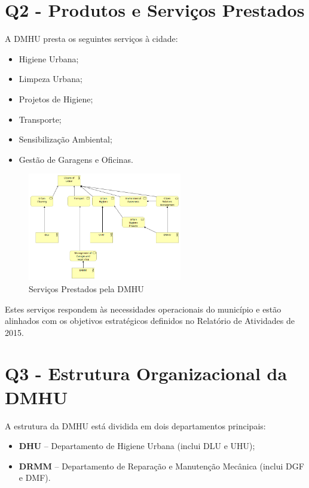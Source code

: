 \documentclass[12pt,a4paper,final]{article}
\begin{document}
    \section*{Q2 - Produtos e Serviços Prestados}\label{sec:produtos-e-servicos-prestados}
    A DMHU presta os seguintes serviços à cidade:
    \begin{itemize}
        \item Higiene Urbana;
        \item Limpeza Urbana;
        \item Projetos de Higiene;
        \item Transporte;
        \item Sensibilização Ambiental;
        \item Gestão de Garagens e Oficinas.
    \end{itemize}

    \begin{figure}[H]
        \centering
        \includegraphics[width=0.6\textwidth]{Q2 - Business Services}
        \caption{Serviços Prestados pela DMHU}
        \label{fig:2}
    \end{figure}

    Estes serviços respondem às necessidades operacionais do município e estão alinhados com os objetivos estratégicos definidos no Relatório de Atividades de 2015.

    \section*{Q3 - Estrutura Organizacional da DMHU}\label{sec:estrutura-organizacional-da-dmhu}
    A estrutura da DMHU está dividida em dois departamentos principais:
    \begin{itemize}
        \item \textbf{DHU} – Departamento de Higiene Urbana (inclui DLU e UHU);
        \item \textbf{DRMM} – Departamento de Reparação e Manutenção Mecânica (inclui DGF e DMF).
    \end{itemize}
\end{document}

